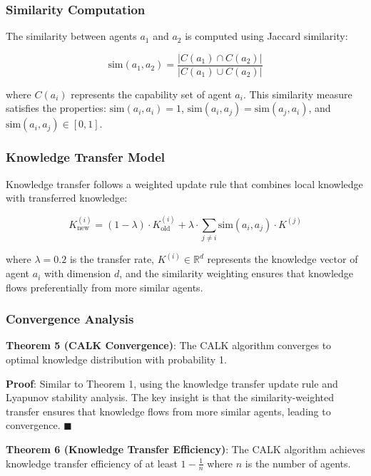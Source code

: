 \documentclass[conference]{IEEEtran}
\begin{document}
\subsubsection{Similarity Computation}

The similarity between agents $a_1$ and $a_2$ is computed using Jaccard similarity:

\begin{equation}
\text{sim}(a_1, a_2) = \frac{|C(a_1) \cap C(a_2)|}{|C(a_1) \cup C(a_2)|}
\end{equation}

where $C(a_i)$ represents the capability set of agent $a_i$. This similarity measure satisfies the properties: $\text{sim}(a_i, a_i) = 1$, $\text{sim}(a_i, a_j) = \text{sim}(a_j, a_i)$, and $\text{sim}(a_i, a_j) \in [0,1]$.

\subsubsection{Knowledge Transfer Model}

Knowledge transfer follows a weighted update rule that combines local knowledge with transferred knowledge:

\begin{equation}
K_{\text{new}}^{(i)} = (1-\lambda) \cdot K_{\text{old}}^{(i)} + \lambda \cdot \sum_{j \neq i} \text{sim}(a_i, a_j) \cdot K^{(j)}
\end{equation}

where $\lambda = 0.2$ is the transfer rate, $K^{(i)} \in \mathbb{R}^d$ represents the knowledge vector of agent $a_i$ with dimension $d$, and the similarity weighting ensures that knowledge flows preferentially from more similar agents.

\subsubsection{Convergence Analysis}

\textbf{Theorem 5 (CALK Convergence)}: The CALK algorithm converges to optimal knowledge distribution with probability 1.

\textbf{Proof}: Similar to Theorem 1, using the knowledge transfer update rule and Lyapunov stability analysis. The key insight is that the similarity-weighted transfer ensures that knowledge flows from more similar agents, leading to convergence. $\blacksquare$

\textbf{Theorem 6 (Knowledge Transfer Efficiency)}: The CALK algorithm achieves knowledge transfer efficiency of at least $1 - \frac{1}{n}$ where $n$ is the number of agents.
\end{document}
